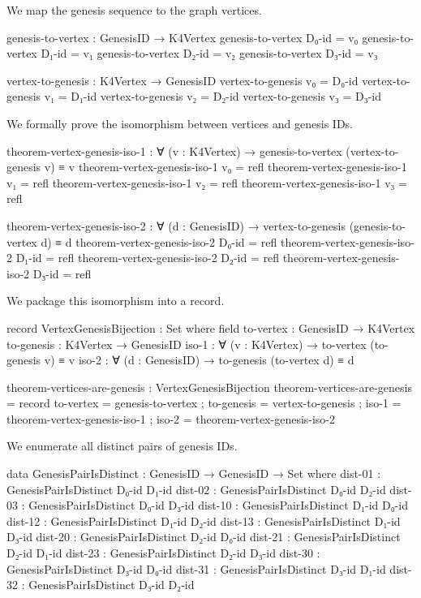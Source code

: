 \documentclass[11pt,a4paper]{book}
\begin{document}
We map the genesis sequence to the graph vertices.

\begin{code}
genesis-to-vertex : GenesisID → K4Vertex
genesis-to-vertex D₀-id = v₀
genesis-to-vertex D₁-id = v₁
genesis-to-vertex D₂-id = v₂
genesis-to-vertex D₃-id = v₃

vertex-to-genesis : K4Vertex → GenesisID
vertex-to-genesis v₀ = D₀-id
vertex-to-genesis v₁ = D₁-id
vertex-to-genesis v₂ = D₂-id
vertex-to-genesis v₃ = D₃-id

\end{code}

We formally prove the isomorphism between vertices and genesis IDs.

\begin{code}
theorem-vertex-genesis-iso-1 : ∀ (v : K4Vertex) → genesis-to-vertex (vertex-to-genesis v) ≡ v
theorem-vertex-genesis-iso-1 v₀ = refl
theorem-vertex-genesis-iso-1 v₁ = refl
theorem-vertex-genesis-iso-1 v₂ = refl
theorem-vertex-genesis-iso-1 v₃ = refl

theorem-vertex-genesis-iso-2 : ∀ (d : GenesisID) → vertex-to-genesis (genesis-to-vertex d) ≡ d
theorem-vertex-genesis-iso-2 D₀-id = refl
theorem-vertex-genesis-iso-2 D₁-id = refl
theorem-vertex-genesis-iso-2 D₂-id = refl
theorem-vertex-genesis-iso-2 D₃-id = refl

\end{code}

We package this isomorphism into a record.

\begin{code}
record VertexGenesisBijection : Set where
  field
    to-vertex : GenesisID → K4Vertex
    to-genesis : K4Vertex → GenesisID
    iso-1 : ∀ (v : K4Vertex) → to-vertex (to-genesis v) ≡ v
    iso-2 : ∀ (d : GenesisID) → to-genesis (to-vertex d) ≡ d

theorem-vertices-are-genesis : VertexGenesisBijection
theorem-vertices-are-genesis = record
  { to-vertex = genesis-to-vertex
  ; to-genesis = vertex-to-genesis
  ; iso-1 = theorem-vertex-genesis-iso-1
  ; iso-2 = theorem-vertex-genesis-iso-2
  }

\end{code}

We enumerate all distinct pairs of genesis IDs.

\begin{code}
data GenesisPairIsDistinct : GenesisID → GenesisID → Set where
  dist-01 : GenesisPairIsDistinct D₀-id D₁-id
  dist-02 : GenesisPairIsDistinct D₀-id D₂-id
  dist-03 : GenesisPairIsDistinct D₀-id D₃-id
  dist-10 : GenesisPairIsDistinct D₁-id D₀-id
  dist-12 : GenesisPairIsDistinct D₁-id D₂-id
  dist-13 : GenesisPairIsDistinct D₁-id D₃-id
  dist-20 : GenesisPairIsDistinct D₂-id D₀-id
  dist-21 : GenesisPairIsDistinct D₂-id D₁-id
  dist-23 : GenesisPairIsDistinct D₂-id D₃-id
  dist-30 : GenesisPairIsDistinct D₃-id D₀-id
  dist-31 : GenesisPairIsDistinct D₃-id D₁-id
  dist-32 : GenesisPairIsDistinct D₃-id D₂-id

\end{code}
\end{document}

